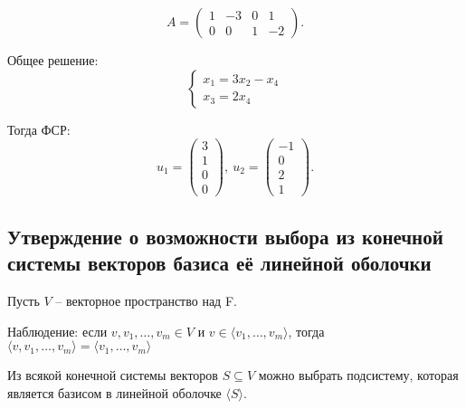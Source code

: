 \begin{example}
    \begin{equation*}
        A = \begin{pmatrix} 
            1 & -3 & 0 & 1 \\
            0 & 0 & 1 & -2
        \end{pmatrix}
    .\end{equation*}

    Общее решение:
    \begin{equation*}
        \begin{cases}
            x_1 = 3x_2 - x_4 \\
            x_3 = 2x_4
        \end{cases}
    \end{equation*}

    Тогда ФСР:
    \begin{equation*}
        u_1 = \begin{pmatrix} 3 \\ 1 \\ 0 \\ 0 \end{pmatrix}, \
        u_2 = \begin{pmatrix} -1 \\ 0 \\ 2 \\ 1 \end{pmatrix}
    .\end{equation*}
\end{example}


\subsection{Утверждение о возможности выбора из конечной системы векторов базиса её линейной оболочки}

Пусть $V$ -- векторное пространство над F.

Наблюдение: если $v, v_1, \dots, v_m \in V$ и $v \in \langle v_1, \dots, v_m \rangle$, тогда $\langle v, v_1, \dots, v_m \rangle = \langle v_1, \dots, v_m \rangle$

\begin{proposal}
    Из всякой конечной системы векторов $S \subseteq V$ можно выбрать подсистему, которая является базисом в линейной оболочке $\langle S \rangle$.
\end{proposal}

